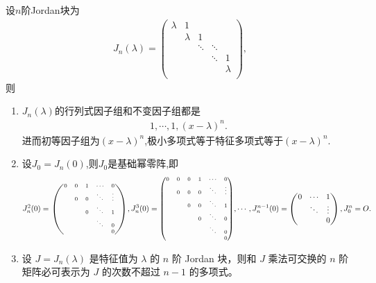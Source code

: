 \documentclass[../../main.tex]{subfiles}
\begin{document}
\begin{proposition}[Jordan块的性质]\label{proposition:Jordan块的性质}
设$n$阶Jordan块为
\begin{align*}
J_n(\lambda)=\left( \begin{matrix}
\lambda&		1&		&		&		\\
&		\lambda&		1&		&		\\
&		&		\ddots&		\ddots&		\\
&		&		&		\ddots&		1\\
&		&		&		&		\lambda\\
\end{matrix} \right) ,
\end{align*}
则
\begin{enumerate}[(1)]
\item $J_n(\lambda)$的行列式因子组和不变因子组都是
\begin{align*}
1,\cdots,1,(x-\lambda)^n.
\end{align*}
进而初等因子组为$(x-\lambda)^n$,极小多项式等于特征多项式等于$(x-\lambda)^n$.

\item 设$J_0=J_n(0)$,则$J_0$是基础幂零阵,即
\begin{align*}
J_n^2(0)={\scriptsize \begin{pmatrix}
0 & 0 & 1 & \cdots & 0 \\
& 0 & 0 & \ddots & \vdots \\
& & 0 & \ddots & 1 \\
& & & \ddots & 0 \\
& & & & 0
\end{pmatrix}},J_n^3(0)={\scriptsize \begin{pmatrix}
0 & 0 & 0 & 1 & \cdots & 0 \\
& 0 & 0 & 0 & \ddots & \vdots \\
& & 0 & 0 & \ddots & 1 \\
& & & 0 & \ddots & 0 \\
& & & & \ddots & 0 \\
& & & & & 0
\end{pmatrix}},\cdots,J_n^{n - 1}(0)=\begin{pmatrix}
0 & \cdots & 1 \\
& \ddots & \vdots \\
& & 0
\end{pmatrix},J_0^n=O.
\end{align*}

\item 设 $J = J_n(\lambda)$ 是特征值为 $\lambda$ 的 $n$ 阶 Jordan 块，则和 $J$ 乘法可交换的 $n$ 阶矩阵必可表示为 $J$ 的次数不超过 $n - 1$ 的多项式。


\end{enumerate}
\end{proposition}
\end{document}
